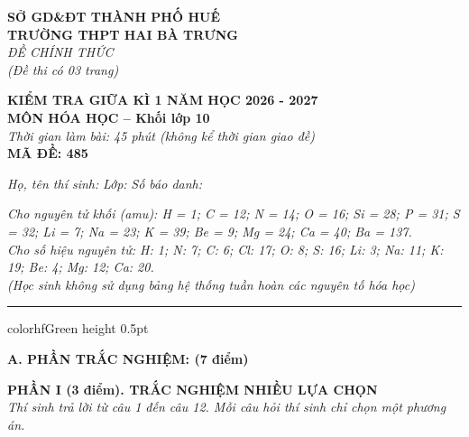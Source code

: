 \documentclass[11pt,a4paper]{article}
\begin{document}
\begin{minipage}[t]{0.48\textwidth}
\textbf{SỞ GD\&ĐT THÀNH PHỐ HUẾ}\\
\textbf{TRƯỜNG THPT HAI BÀ TRƯNG}\\
\textit{ĐỀ CHÍNH THỨC}\\
\textit{(Đề thi có 03 trang)}
\end{minipage}
\hfill
\begin{minipage}[t]{0.48\textwidth}
\raggedleft
\textbf{\color{hfRed}KIỂM TRA GIỮA KÌ 1 NĂM HỌC 2026 - 2027}\\
\textbf{MÔN HÓA HỌC -- Khối lớp 10}\\
\textit{Thời gian làm bài: 45 phút (không kể thời gian giao đề)}\\
\textbf{MÃ ĐỀ: 485}
\end{minipage}

\vspace{4pt}
\noindent
\textit{Họ, tên thí sinh:} \dotfill \textit{Lớp:} \dotfill \textit{Số báo danh:} \dotfill

\vspace{3pt}
\noindent
\textit{\footnotesize Cho nguyên tử khối (amu): H = 1; C = 12; N = 14; O = 16; Si = 28; P = 31; S = 32; Li = 7; Na = 23; K = 39; Be = 9; Mg = 24; Ca = 40; Ba = 137.\\
Cho số hiệu nguyên tử: H: 1; N: 7; C: 6; Cl: 17; O: 8; S: 16; Li: 3; Na: 11; K: 19; Be: 4; Mg: 12; Ca: 20.\\
(Học sinh không sử dụng bảng hệ thống tuần hoàn các nguyên tố hóa học)}

\vspace{3pt}
\hrule color{hfGreen} height 0.5pt

\vspace{4pt}
\noindent
{\color{mainGreen}\textbf{\Large A. PHẦN TRẮC NGHIỆM: (7 điểm)}}

\vspace{3pt}
\noindent
{\color{mainGreen}\textbf{\large PHẦN I (3 điểm). TRẮC NGHIỆM NHIỀU LỰA CHỌN}}\\
\textit{\small Thí sinh trả lời từ câu 1 đến câu 12. Mỗi câu hỏi thí sinh chỉ chọn một phương án.}
\vspace{2pt}
\end{document}
